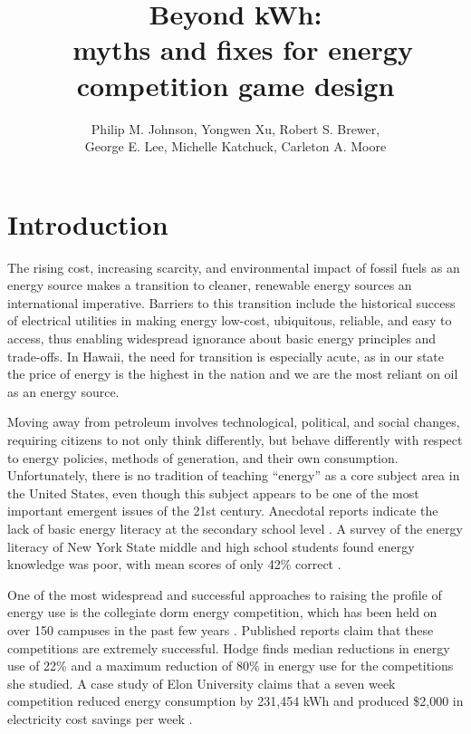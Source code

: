 \documentclass[jou]{apa} %
\title{Beyond kWh: \\ \
       myths and fixes for energy competition game design}
\author{Philip M. Johnson, Yongwen Xu, Robert S. Brewer, \\ George E. Lee, Michelle Katchuck,
  Carleton A. Moore}
\affiliation{Collaborative Software Development Laboratory \\ Information and Computer
  Sciences \\ University of Hawaii \\ Honolulu, HI USA \\ johnson@hawaii.edu}
\begin{document}
\maketitle 

\section{Introduction}  

The rising cost, increasing scarcity, and environmental impact of fossil fuels as an
energy source makes a transition to cleaner, renewable energy sources an international
imperative. Barriers to this transition include the historical success of electrical
utilities in making energy low-cost, ubiquitous, reliable, and easy to access, thus
enabling widespread ignorance about basic energy principles and trade-offs.  In Hawaii,
the need for transition is especially acute, as in our state the price of energy is the
highest in the nation and we are the most reliant on oil as an energy source.

Moving away from petroleum involves technological, political, and social changes,
requiring citizens to not only think differently, but behave differently with respect to
energy policies, methods of generation, and their own consumption. Unfortunately, there is
no tradition of teaching ``energy'' as a core subject area in the United States, even
though this subject appears to be one of the most important emergent issues of the 21st
century. Anecdotal reports indicate the lack of basic energy literacy at the secondary
school level \cite{Ammons2010}. A survey of the energy literacy of New York State
middle and high school students found energy knowledge was poor, with mean scores of only
42\% correct \cite{DeWaters2011}.



One of the most widespread and successful approaches to raising the profile of energy use
is the collegiate dorm energy competition, which has been held on over 150 campuses in the
past few years \cite{Hodge2010}.  Published reports claim that these competitions are
extremely successful.  Hodge finds median reductions in energy use of 22\% and a maximum
reduction of 80\% in energy use for the competitions she studied. A case study of Elon
University claims that a seven week competition reduced energy consumption by 231,454 kWh
and produced \$2,000 in electricity cost savings per week \cite{Durr2010}.
\end{document}
